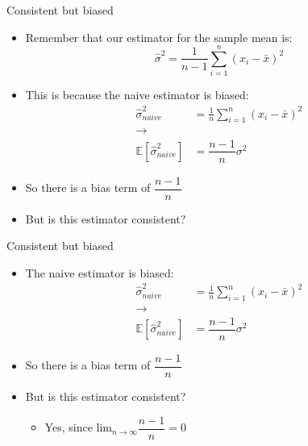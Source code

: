 \documentclass[aspectratio=169]{beamer}
\begin{document}
\begin{frame}{Consistent but biased}
    \begin{itemize}
        \item Remember that our estimator for the sample mean is:
        $$
            \hat{\sigma}^2 = \frac{1}{n-1} \sum_{i=1}^n (x_i - \bar{x})^2
        $$
        \item This is because the naive estimator is biased:
        \begin{equation*}
            \begin{split}
                \hat{\sigma}_{naive}^2 & = \frac{1}{n} \sum_{i=1}^n (x_i - \bar{x})^2 \\
                \rightarrow & \\
                \mathbb{E} [\hat{\sigma}_{naive}^2] & = \dfrac{n-1}{n} \sigma^2
            \end{split}
        \end{equation*}
        \item So there is a bias term of $\dfrac{n-1}{n}$
        \item But is this estimator consistent?
    \end{itemize}
\end{frame}

\begin{frame}{Consistent but biased}
    \begin{itemize}
        \item The naive estimator is biased:
        \begin{equation*}
            \begin{split}
                \hat{\sigma}_{naive}^2 & = \frac{1}{n} \sum_{i=1}^n (x_i - \bar{x})^2 \\
                \rightarrow & \\
                \mathbb{E} [\hat{\sigma}_{naive}^2] & = \dfrac{n-1}{n} \sigma^2
            \end{split}
        \end{equation*}
        \item So there is a bias term of $\dfrac{n-1}{n}$
        \item But is this estimator consistent?
        \begin{itemize}
            \item Yes, since $\text{lim}_{n \to \infty} \dfrac{n-1}{n} = 0$
        \end{itemize}
    \end{itemize}
\end{frame}
\end{document}

